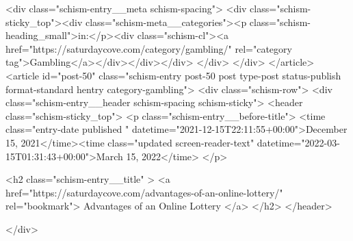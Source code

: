 {		<div class="schism-entry__meta schism-spacing">			<div class="schism-sticky_top"><div class="schism-meta__categories"><p class="schism-heading_small">in:</p><div class="schism-cl"><a href="https://saturdaycove.com/category/gambling/" rel="category tag">Gambling</a></div></div></div>		</div>
	</div>
</article>
<article id="post-50" class="schism-entry post-50 post type-post status-publish format-standard hentry category-gambling">
	<div class="schism-row">		<div class="schism-entry__header schism-spacing schism-sticky">			<header class="schism-sticky_top">				<p class="schism-entry__before-title">
					<time class="entry-date published " datetime="2021-12-15T22:11:55+00:00">December 15, 2021</time><time class="updated screen-reader-text" datetime="2022-03-15T01:31:43+00:00">March 15, 2022</time>				</p>

				<h2 class="schism-entry__title" >
					<a href="https://saturdaycove.com/advantages-of-an-online-lottery/" rel="bookmark">
						Advantages of an Online Lottery					</a>
				</h2>
			</header>

					</div>

}
